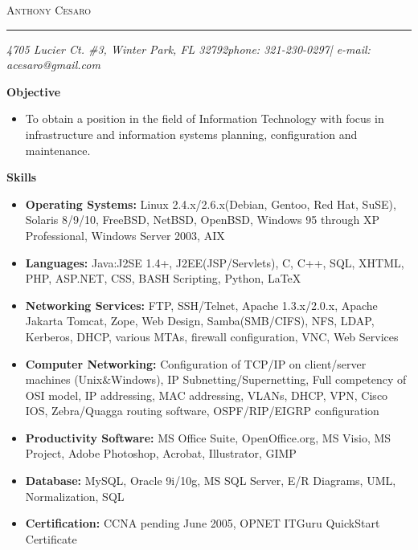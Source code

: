 \documentclass[10pt,oneside]{article}
\makeatletter
\newcommand{\name}{Anthony Cesaro}
\newcommand{\addr}{4705 Lucier Ct. \#3, Winter Park, FL 32792}
\newcommand{\phone}{321-230-0297}
\newcommand{\email}{acesaro@gmail.com}
\newcommand{\bigname}[1]{
	\begin{flushleft}\selectfont\Large\scshape#1\end{flushleft}
}
\newenvironment{ressection}[1]{
	\vspace{4pt}
	\textbf{\selectfont\normalsize#1}
	\begin{itemize}
	\vspace{3pt}
}{
	\end{itemize}
}
\newcommand{\resitem}[1]{
	\vspace{-4pt}
	\item \begin{flushleft} #1 \end{flushleft}
}
\makeatother
\begin{document}

\bigname{\name}

\vspace{-8pt} \rule{\textwidth}{1pt}

\vspace{-1pt} {\small\itshape \addr \hfill phone: \phone | e-mail: \email}

\vspace{8 pt}



\begin{ressection}{Objective}

	\resitem{To obtain a position in the field of Information Technology with focus in infrastructure and information systems planning, configuration and maintenance.}

\end{ressection}


\begin{ressection}{Skills}

	\resitem{\textbf{Operating Systems:} Linux 2.4.x/2.6.x(Debian, Gentoo, Red Hat, SuSE), Solaris 8/9/10, FreeBSD, NetBSD, OpenBSD, Windows 95 through XP Professional, Windows Server 2003, AIX}
	
	\resitem{\textbf{Languages:} Java:J2SE 1.4+, J2EE(JSP/Servlets), C, C++, SQL, XHTML, PHP, ASP.NET, CSS, BASH Scripting, Python, \LaTeX}

	\resitem{\textbf{Networking Services:} FTP, SSH/Telnet, Apache 1.3.x/2.0.x, Apache Jakarta Tomcat, Zope, Web Design, Samba(SMB/CIFS), NFS, LDAP, Kerberos, DHCP,  various MTAs, firewall configuration, VNC, Web Services}

	\resitem{\textbf{Computer Networking:} Configuration of TCP/IP on client/server machines (Unix\&Windows), IP Subnetting/Supernetting, Full competency of OSI model, IP addressing, MAC addressing, VLANs, DHCP, VPN, Cisco IOS, Zebra/Quagga routing software, OSPF/RIP/EIGRP configuration}

	\resitem{\textbf{Productivity Software:} MS Office Suite, OpenOffice.org, MS Visio, MS Project, Adobe Photoshop, Acrobat, Illustrator, GIMP}

	\resitem{\textbf{Database:} MySQL, Oracle 9i/10g, MS SQL Server, E/R Diagrams, UML, Normalization, SQL}

	\resitem{\textbf{Certification:} CCNA pending June 2005, OPNET ITGuru QuickStart Certificate}
	
\end{ressection}
\end{document}
